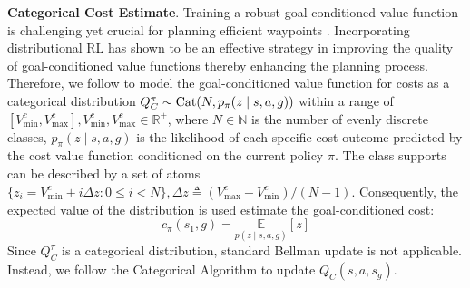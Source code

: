 \documentclass[letterpaper, 10 pt, conference]{IEEEConference}
\begin{document}
\textbf{Categorical Cost Estimate}. Training a robust goal-conditioned value function is challenging yet crucial for planning efficient waypoints \cite{eysenbach2019search}. Incorporating distributional RL \cite{bellemare2017distributional} has shown to be an effective strategy in improving the quality of goal-conditioned value functions thereby enhancing the planning process. Therefore, we follow \cite{bellemare2017distributional} to model the goal-conditioned value function for costs as a categorical distribution $Q_C^{\pi} \sim \textnormal{Cat}(N,p_{\pi}(z\mid s,a,g))$ within a range of $[V_{\min}^{c},V_{\max}^{c}],V_{\min}^{c},V_{\max}^{c}\in\mathbb{R}^{+}$, where $N \in \mathbb{N}$ is the number of evenly discrete classes, $p_{\pi}(z\mid s,a,g)$ is the likelihood of each specific cost outcome predicted by the cost value function conditioned on the current policy $\pi$. The class supports can be described by a set of atoms $\{z_{i} = V_{\min}^{c} + i \Delta z: 0 \le i <N \}, \Delta z \triangleq (V_{\max}^{c} - V_{\min}^{c}) / (N-1)$. Consequently, the expected value of the distribution is used estimate the goal-conditioned cost:
\begin{equation}
    c_{\pi}(s_{1}, g)=\underset{p(z \mid s, a, g)}{\mathbb{E}} \left[ z \right]
    \label{eq:cat_cost}
\end{equation}
Since $Q_C^{\pi}$ is a categorical distribution, standard Bellman update is not applicable. Instead, we follow the Categorical Algorithm \cite{bellemare2017distributional} to update $Q_C(s, a, s_g)$. 
\end{document}
